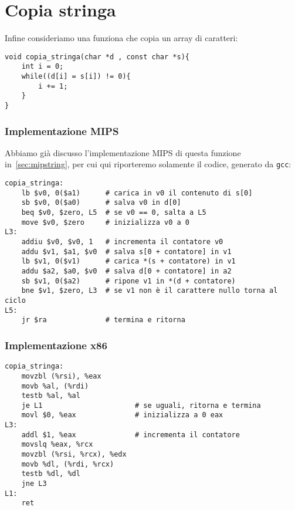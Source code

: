 \documentclass[class=book, crop=false, oneside]{standalone}
\begin{document}
\section{Copia stringa}
Infine consideriamo una funziona che copia un array di caratteri:
\begin{verbatim}
void copia_stringa(char *d , const char *s){
	int i = 0;
	while((d[i] = s[i]) != 0){
		i += 1;
	}
}
\end{verbatim}

\subsubsection{Implementazione MIPS}
Abbiamo già discusso l'implementazione MIPS di questa funzione in~\ref{sec:mipstring}, per cui qui riporteremo solamente il codice, generato da \texttt{gcc}:
\begin{verbatim}
copia_stringa:
	lb $v0, 0($a1)      # carica in v0 il contenuto di s[0]
	sb $v0, 0($a0)      # salva v0 in d[0]
	beq $v0, $zero, L5  # se v0 == 0, salta a L5
	move $v0, $zero     # inizializza v0 a 0
L3:
	addiu $v0, $v0, 1   # incrementa il contatore v0
	addu $v1, $a1, $v0  # salva s[0 + contatore] in v1
	lb $v1, 0($v1)      # carica *(s + contatore) in v1
	addu $a2, $a0, $v0  # salva d[0 + contatore] in a2
	sb $v1, 0($a2)      # ripone v1 in *(d + contatore)
	bne $v1, $zero, L3  # se v1 non è il carattere nullo torna al ciclo
L5:
	jr $ra              # termina e ritorna
\end{verbatim}

\subsubsection{Implementazione x86}

\begin{verbatim}
copia_stringa:
	movzbl (%rsi), %eax
	movb %al, (%rdi)
	testb %al, %al
	je L1                      # se uguali, ritorna e termina
	movl $0, %eax              # inizializza a 0 eax
L3:
	addl $1, %eax              # incrementa il contatore
	movslq %eax, %rcx
	movzbl (%rsi, %rcx), %edx
	movb %dl, (%rdi, %rcx)
	testb %dl, %dl
	jne L3
L1:
	ret
\end{verbatim}
\end{document}
